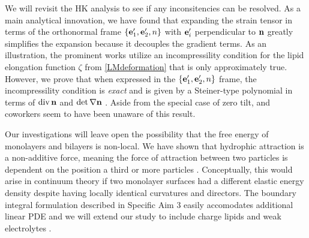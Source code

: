   We will revisit the HK analysis to see if any inconsitencies can be resolved.
  As a main analytical innovation, we have found that expanding the strain tensor in
  terms of the orthonormal frame $\{{\bf e}'_1, {\bf e}'_2, n\}$ with ${\bf e}'_i$ perpendicular to ${\bf n}$
  greatly simplifies the expansion because it decouples the gradient terms. As an illustration, the prominent works
  \cite{TerziDeserno17, PhysRevE.102.042406, Hamm2000, C9SM02079A} utilize an
  incompressility condition for the lipid elongation function $\zeta$ from \eqref{LMdeformation} that is only approximately true. 
  However, we prove that when expressed in the $\{{\bf e}'_1, {\bf e}'_2, n\}$ frame, the incompressility condition is \emph{exact}
  and is given by a Steiner-type polynomial in terms of $\operatorname{div} {\bf n}$ and $\det \nabla {\bf n}$ \cite{Fe59}.
  Aside from the special case of zero tilt, \cite{Hamm2000} and coworkers seem to have been unaware of this result.

Our investigations will leave open the possibility that the free energy of monolayers and bilayers is non-local. 
We have shown that hydrophic attraction is a non-additive force, meaning the force of attraction between two
particles is dependent on the position a third or more particles \cite{SilveraBatista1242477}.
Conceptually, this would arise in continuum theory if two monolayer surfaces
had a different elastic energy density despite having locally identical curvatures and directors.
The boundary integral formulation described in Specific Aim 3 easily accomodates additional linear PDE and
we will extend our study to include charge lipids and weak electrolytes \cite{C9SM00772E}.



